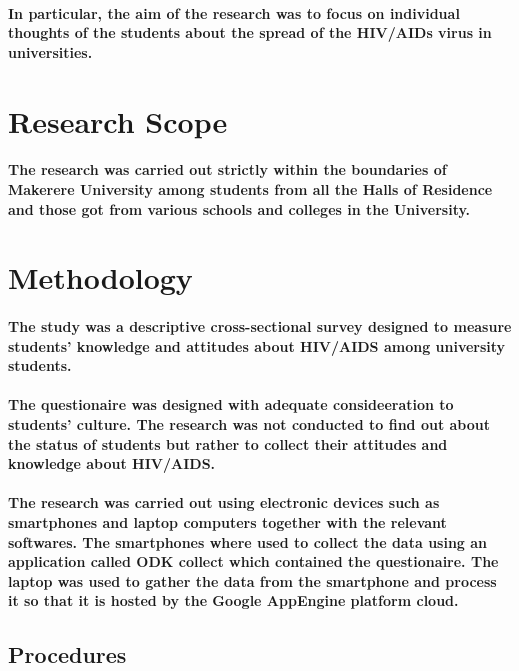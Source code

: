 \documentclass{article}
\begin{document}
\paragraph{In particular, the aim of the research was to focus on individual thoughts of the students about the spread of the HIV/AIDs virus in universities.}

\section{Research Scope}
\paragraph{The research was carried out strictly within the boundaries of Makerere University among students from all the Halls of Residence and those got from various schools and colleges in the University.}

\section{ Methodology}
\paragraph{The study was a descriptive cross-sectional survey designed to measure students’ knowledge and attitudes about HIV/AIDS among university students.}
\paragraph{The questionaire was designed with adequate consideeration to students' culture. The research was not conducted to find out about the status of students but rather to collect their attitudes and knowledge about HIV/AIDS.}
\paragraph{The research was carried out using electronic devices such as smartphones and laptop computers together with the relevant softwares. The smartphones where used to collect the data using an application called ODK collect which contained the questionaire. The laptop was used to gather the data from the smartphone and process it so that it is hosted by the Google AppEngine platform cloud.}

\subsection{Procedures}
\end{document}
